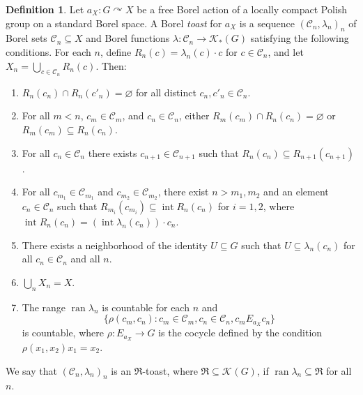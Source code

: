 \documentclass[12pt]{paper}
\numberwithin{equation}{section}
\theoremstyle{plain}
\theoremstyle{definition}
\newtheorem{definition}[theorem]{Definition}
\newcommand{\mfR}{\mathfrak{R}}
\newcommand{\vietoris}[2][]{\mathcal{K}_{#1}(#2)}
\DeclareMathOperator{\ran}{\mathrm{ran}}
\DeclareMathOperator{\inter}{\mathrm{int}}
\newcommand{\acts}{\curvearrowright}
\begin{document}
\begin{definition}
  \label{def:toast}
  Let \(a_{X} : G \acts X\) be a free Borel action of a locally compact Polish group on a standard
  Borel space. A Borel \emph{toast} for \(a_{X}\) is a sequence
  \((\mathcal{C}_{n}, \lambda_{n})_{n}\) of Borel sets \(\mathcal{C}_{n} \subseteq X\) and Borel
  functions \(\lambda : \mathcal{C}_{n} \to \vietoris[*]{G}\) satisfying the following
  conditions. For each \(n\), define \(R_{n}(c) = \lambda_{n}(c)\cdot c\) for
  \(c \in \mathcal{C}_{n}\), and let \(X_{n} = \bigcup_{c \in \mathcal{C}_{n}} R_{n}(c)\). Then:
  \begin{enumerate}[leftmargin=1cm, label={\sf \arabic*}., ref={\sf \arabic*}]
  \item\label{item:toast-disjoint} \(R_{n}(c_{n}) \cap R_{n}(c'_{n}) = \varnothing\) for all
    distinct \(c_{n}, c'_{n} \in \mathcal{C}_{n}\).
  \item\label{item:toast-coherent} For all \(m < n\), \(c_{m} \in \mathcal{C}_{m}\), and
    \(c_{n} \in \mathcal{C}_{n}\), either \(R_{m}(c_{m}) \cap R_{n}(c_{n}) = \varnothing\) or
    \(R_{m}(c_{m}) \subseteq R_{n}(c_{n})\).
  \item\label{item:toast-layered} For all \(c_{n} \in \mathcal{C}_{n}\) there exists
    \(c_{n+1} \in \mathcal{C}_{n+1}\) such that \(R_{n}(c_{n}) \subseteq R_{n+1}(c_{n+1})\).
  \item\label{item:toast-directed} For all \(c_{m_{1}} \in \mathcal{C}_{m_{1}}\) and
    \(c_{m_{2}} \in \mathcal{C}_{m_{2}}\), there exist \(n > m_{1}, m_{2}\) and an element
    \(c_{n} \in \mathcal{C}_{n}\) such that \(R_{m_{i}}(c_{m_{i}}) \subseteq \inter R_{n}(c_{n})\)
    for \(i = 1,2\), where \(\inter R_{n}(c_{n}) = (\inter \lambda_{n}(c_{n})) \cdot c_{n}\).
  \item\label{item:lacunary} There exists a neighborhood of the identity \(U \subseteq G\) such that
    \(U \subseteq \lambda_{n}(c_{n})\) for all \(c_{n} \in \mathcal{C}_{n}\) and all \(n\).
  \item\label{item:toast-exhaustive} \(\bigcup_{n} X_{n} = X\).
  \item\label{item:toast-rational} The range \(\ran \lambda_{n}\) is countable for each \(n\) and
    \[\{\rho(c_{m},c_{n}) : c_{m} \in \mathcal{C}_{m}, c_{n} \in \mathcal{C}_{n}, c_{m} E_{a_{X}}
      c_{n}\}\]
    is countable, where \(\rho : E_{a_{X}} \to G\) is the cocycle defined by the condition
    \(\rho(x_{1},x_{2})x_{1} = x_{2}\).
  \end{enumerate}
  We say that \((\mathcal{C}_{n}, \lambda_{n})_{n}\) is an \(\mfR\)-toast, where
  \(\mfR \subseteq \vietoris{G}\), if \(\ran \lambda_{n} \subseteq \mfR\) for all \(n\).
\end{definition}
\end{document}
